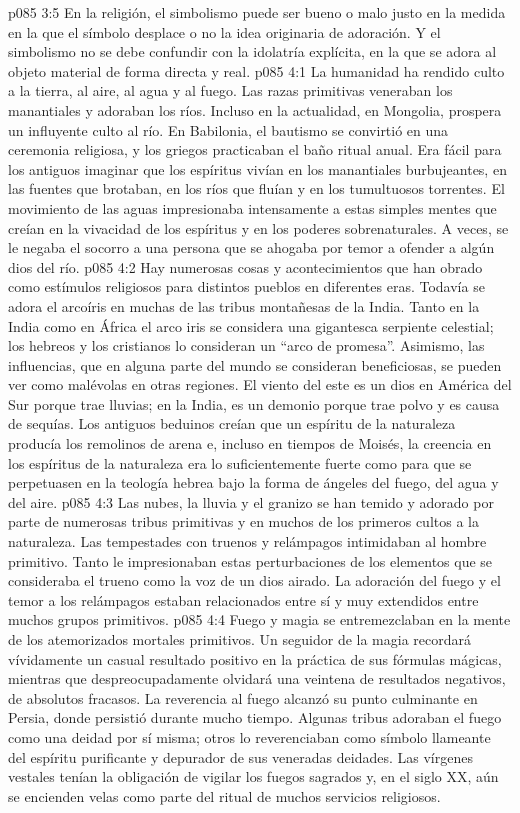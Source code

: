 \vs p085 3:5 En la religión, el simbolismo puede ser bueno o malo justo en la medida en la que el símbolo desplace o no la idea originaria de adoración. Y el simbolismo no se debe confundir con la idolatría explícita, en la que se adora al objeto material de forma directa y real.
\vs p085 4:1 La humanidad ha rendido culto a la tierra, al aire, al agua y al fuego. Las razas primitivas veneraban los manantiales y adoraban los ríos. Incluso en la actualidad, en Mongolia, prospera un influyente culto al río. En Babilonia, el bautismo se convirtió en una ceremonia religiosa, y los griegos practicaban el baño ritual anual. Era fácil para los antiguos imaginar que los espíritus vivían en los manantiales burbujeantes, en las fuentes que brotaban, en los ríos que fluían y en los tumultuosos torrentes. El movimiento de las aguas impresionaba intensamente a estas simples mentes que creían en la vivacidad de los espíritus y en los poderes sobrenaturales. A veces, se le negaba el socorro a una persona que se ahogaba por temor a ofender a algún dios del río.
\vs p085 4:2 Hay numerosas cosas y acontecimientos que han obrado como estímulos religiosos para distintos pueblos en diferentes eras. Todavía se adora el arcoíris en muchas de las tribus montañesas de la India. Tanto en la India como en África el arco iris se considera una gigantesca serpiente celestial; los hebreos y los cristianos lo consideran un “arco de promesa”. Asimismo, las influencias, que en alguna parte del mundo se consideran beneficiosas, se pueden ver como malévolas en otras regiones. El viento del este es un dios en América del Sur porque trae lluvias; en la India, es un demonio porque trae polvo y es causa de sequías. Los antiguos beduinos creían que un espíritu de la naturaleza producía los remolinos de arena e, incluso en tiempos de Moisés, la creencia en los espíritus de la naturaleza era lo suficientemente fuerte como para que se perpetuasen en la teología hebrea bajo la forma de ángeles del fuego, del agua y del aire.
\vs p085 4:3 Las nubes, la lluvia y el granizo se han temido y adorado por parte de numerosas tribus primitivas y en muchos de los primeros cultos a la naturaleza. Las tempestades con truenos y relámpagos intimidaban al hombre primitivo. Tanto le impresionaban estas perturbaciones de los elementos que se consideraba el trueno como la voz de un dios airado. La adoración del fuego y el temor a los relámpagos estaban relacionados entre sí y muy extendidos entre muchos grupos primitivos.
\vs p085 4:4 Fuego y magia se entremezclaban en la mente de los atemorizados mortales primitivos. Un seguidor de la magia recordará vívidamente un casual resultado positivo en la práctica de sus fórmulas mágicas, mientras que despreocupadamente olvidará una veintena de resultados negativos, de absolutos fracasos. La reverencia al fuego alcanzó su punto culminante en Persia, donde persistió durante mucho tiempo. Algunas tribus adoraban el fuego como una deidad por sí misma; otros lo reverenciaban como símbolo llameante del espíritu purificante y depurador de sus veneradas deidades. Las vírgenes vestales tenían la obligación de vigilar los fuegos sagrados y, en el siglo XX, aún se encienden velas como parte del ritual de muchos servicios religiosos.
